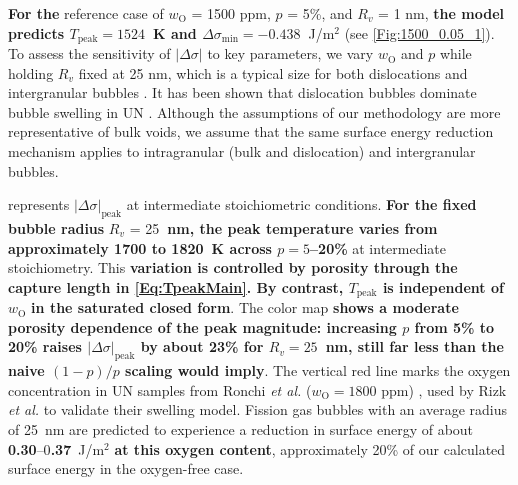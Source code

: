 \documentclass[preprint,12pt,sort&compress]{elsarticle}
\newcommand{\?}{\stackrel{?}{=}}
\providecommand{\DIFaddtex}[1]{{\bf #1}} %
\providecommand{\DIFdeltex}[1]{} %
\providecommand{\DIFaddbegin}{\protect\color{blue}} %
\providecommand{\DIFaddend}{\protect\color{black}} %
\providecommand{\DIFdelbegin}{\protect\color{red}} %
\providecommand{\DIFdelend}{\protect\color{black}} %
\providecommand{\DIFadd}[1]{\texorpdfstring{\DIFaddtex{#1}}{#1}} %
\providecommand{\DIFdel}[1]{\texorpdfstring{\DIFdeltex{#1}}{}} %
\begin{document}
\DIFadd{For the }\DIFaddend reference case of $w_\text{O}$ = 1500 ppm, $p$ = 5\%, and $R_v$ = 1 nm, \DIFdelbegin \DIFdel{$|\Delta \sigma|$ is found to be around 0.4~}\DIFdelend \DIFaddbegin \DIFadd{the model predicts $T_\text{peak}=1524$~K and $\Delta \sigma_\text{min}=-0.438$~}\DIFaddend J/m$^2$ \DIFdelbegin \DIFdel{, occurring within the temperature interval 1300--1700~K }\DIFdelend (see \cref{Fig:1500_0.05_1}). To assess the sensitivity of $|\Delta \sigma|$ to key parameters, we vary $w_\text{O}$ and $p$ while holding $R_v$ fixed at 25 nm, which is a typical size for both dislocations and intergranular bubbles \cite{Colin1983}. It has been shown that dislocation bubbles dominate bubble swelling in UN \cite{Ronchi1975,Ronchi1978,Rizk2025}. Although the assumptions of our methodology are more representative of bulk voids, we assume that the same surface energy reduction mechanism applies to intragranular (bulk and dislocation) and intergranular bubbles.

 represents \DIFdelbegin \DIFdel{the maximum $|\Delta \sigma|$, which occurs }\DIFdelend \DIFaddbegin \DIFadd{$|\Delta \sigma|_\text{peak}$ }\DIFaddend at intermediate stoichiometric conditions. \DIFdelbegin \DIFdel{As explained earlier, because }\DIFdelend \DIFaddbegin \DIFadd{For the fixed bubble radius }\DIFaddend $R_v$ \DIFdelbegin \DIFdel{is kept fixed , the temperature at which this maximum occurs is approximately the same for all $(w_\text{O}, p)$ combinations shown, varying only between $\sim$1620 and $\sim$1750~K for $R_v$ }\DIFdelend = 25\DIFdelbegin \DIFdel{~nm }\DIFdelend \DIFaddbegin \DIFadd{~nm, the peak temperature varies from approximately 1700 to 1820~K across $p=5$--20\% }\DIFaddend at intermediate stoichiometry. This \DIFdelbegin \DIFdel{weak dependence on }\DIFdelend \DIFaddbegin \DIFadd{variation is controlled by porosity through the capture length in \cref{Eq:TpeakMain}. By contrast, $T_\text{peak}$ is independent of }\DIFaddend $w_\text{O}$ \DIFdelbegin \DIFdel{and $p$ follows from \cref{Eq:TpeakMain}, where both parameters enter only through a logarithm}\DIFdelend \DIFaddbegin \DIFadd{in the saturated closed form}\DIFaddend . The color map \DIFdelbegin \DIFdel{reveals that $|\Delta \sigma|$ is weakly dependent on porosity for $R_v$ = 25 nm}\DIFdelend \DIFaddbegin \DIFadd{shows a moderate porosity dependence of the peak magnitude: increasing $p$ from 5\% to 20\% raises $|\Delta\sigma|_\text{peak}$ by about 23\% for $R_v=25$~nm, still far less than the naive $(1-p)/p$ scaling would imply}\DIFaddend . The vertical red line marks the oxygen concentration in UN samples from Ronchi \textit{et al.} ($w_\text{O} = 1800$ ppm) \cite{Ronchi1975,Ronchi1978}, used by Rizk \textit{et al.} \cite{Rizk2025} to validate their swelling model. Fission gas bubbles with an average radius of 25~nm are predicted to experience a reduction in surface energy of about \DIFdelbegin \DIFdel{0.3}\DIFdelend \DIFaddbegin \DIFadd{0.30}\DIFaddend --0\DIFdelbegin \DIFdel{.4}\DIFdelend \DIFaddbegin \DIFadd{.37}\DIFaddend ~J/m$^2$ \DIFaddbegin \DIFadd{at this oxygen content}\DIFaddend , approximately 20\% of our calculated surface energy in the oxygen-free case.
\end{document}
